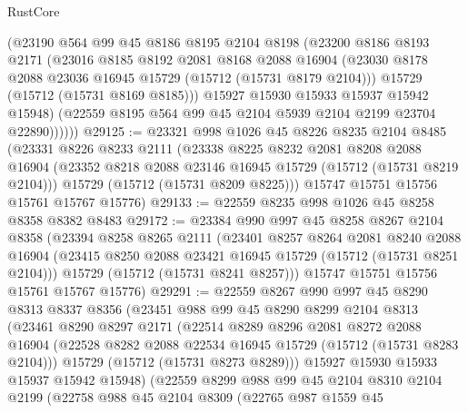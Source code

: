 \begin{lexlean}{RustCore}
\begin{coremodule}
            (@23190
              @564
              @99
              @45
              @8186
              @8195
              @2104
              @8198
              (@23200
                @8186
                @8193
                @2171
                (@23016
                  @8185
                  @8192
                  @2081
                  @8168
                  @2088
                  @16904
                  (@23030 @8178 @2088 @23036 @16945 @15729 (@15712 (@15731 @8179 @2104)))
                  @15729
                  (@15712 (@15731 @8169 @8185)))
                @15927
                @15930
                @15933
                @15937
                @15942
                @15948)
              (@22559 @8195 @564 @99 @45 @2104 @5939 @2104 @2199 @23704 @22890))))))
@29125 := @23321
    @998
    @1026
    @45
    @8226
    @8235
    @2104
    @8485
    (@23331
      @8226
      @8233
      @2111
      (@23338
        @8225
        @8232
        @2081
        @8208
        @2088
        @16904
        (@23352 @8218 @2088 @23146 @16945 @15729 (@15712 (@15731 @8219 @2104)))
        @15729
        (@15712 (@15731 @8209 @8225)))
      @15747
      @15751
      @15756
      @15761
      @15767
      @15776)
@29133 := @22559 @8235 @998 @1026 @45 @8258 @8358 @8382 @8483
@29172 := @23384
    @990
    @997
    @45
    @8258
    @8267
    @2104
    @8358
    (@23394
      @8258
      @8265
      @2111
      (@23401
        @8257
        @8264
        @2081
        @8240
        @2088
        @16904
        (@23415 @8250 @2088 @23421 @16945 @15729 (@15712 (@15731 @8251 @2104)))
        @15729
        (@15712 (@15731 @8241 @8257)))
      @15747
      @15751
      @15756
      @15761
      @15767
      @15776)
@29291 := @22559
    @8267
    @990
    @997
    @45
    @8290
    @8313
    @8337
    @8356
    (@23451
      @988
      @99
      @45
      @8290
      @8299
      @2104
      @8313
      (@23461
        @8290
        @8297
        @2171
        (@22514
          @8289
          @8296
          @2081
          @8272
          @2088
          @16904
          (@22528 @8282 @2088 @22534 @16945 @15729 (@15712 (@15731 @8283 @2104)))
          @15729
          (@15712 (@15731 @8273 @8289)))
        @15927
        @15930
        @15933
        @15937
        @15942
        @15948)
      (@22559
        @8299
        @988
        @99
        @45
        @2104
        @8310
        @2104
        @2199
        (@22758
          @988
          @45
          @2104
          @8309
          (@22765
            @987
            @1559
            @45

\end{coremodule}
\end{lexlean}

